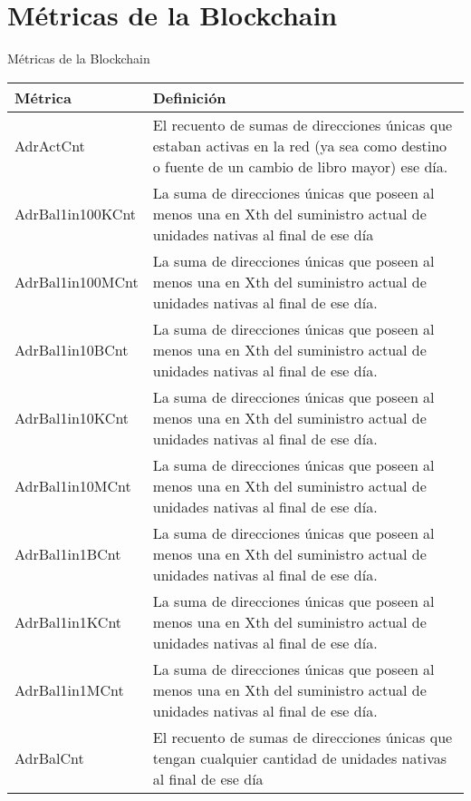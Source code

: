 \chapter[Appendix A]{Métricas de la Blockchain}{Métricas de la Blockchain}\label{appen1}
\vskip 10pt
\noindent

\begin{table}[h!]
	\begin{tabular}{|l|m{12cm}|}
		\hline
		\textbf{Métrica}&\textbf{Definición}\\
		\hline
		AdrActCnt         & El recuento de sumas de direcciones únicas que estaban activas en la red (ya sea como destino o fuente de un cambio de libro mayor) ese día. \\
		\hline
		AdrBal1in100KCnt  & La suma de direcciones únicas que poseen al menos una en Xth del suministro actual de unidades nativas al final de ese día                   \\
		\hline
		AdrBal1in100MCnt  & La suma de direcciones únicas que poseen al menos una en Xth del suministro actual de unidades nativas al final de ese día.                  \\
		\hline
		AdrBal1in10BCnt   & La suma de direcciones únicas que poseen al menos una en Xth del suministro actual de unidades nativas al final de ese día.                  \\
		\hline
		AdrBal1in10KCnt   & La suma de direcciones únicas que poseen al menos una en Xth del suministro actual de unidades nativas al final de ese día.                  \\
		\hline
		AdrBal1in10MCnt   & La suma de direcciones únicas que poseen al menos una en Xth del suministro actual de unidades nativas al final de ese día.                  \\
		\hline
		AdrBal1in1BCnt    & La suma de direcciones únicas que poseen al menos una en Xth del suministro actual de unidades nativas al final de ese día.                  \\
		\hline
		AdrBal1in1KCnt    & La suma de direcciones únicas que poseen al menos una en Xth del suministro actual de unidades nativas al final de ese día.                  \\
		\hline
		AdrBal1in1MCnt    & La suma de direcciones únicas que poseen al menos una en Xth del suministro actual de unidades nativas al final de ese día.                  \\
		\hline
		AdrBalCnt         & El recuento de sumas de direcciones únicas que tengan cualquier cantidad de unidades nativas al final de ese día                             \\

\end{tabular}
\end{table}
